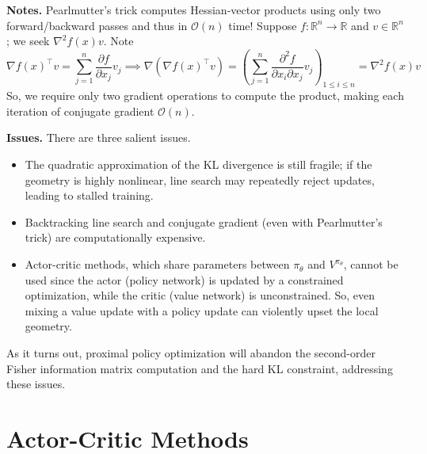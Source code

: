 \documentclass[11pt, letterpaper]{article}
\begin{document}
\begin{remark}
    \textbf{Notes.} Pearlmutter's trick computes Hessian-vector products using only two forward/backward passes and thus in \(\mathcal{O}(n)\) time! Suppose \(f : \mathbb{R}^n \to \mathbb{R}\) and \(v \in \mathbb{R}^n\); we seek \(\nabla^2 f(x) v\). Note 
    \[
        \nabla f(x)^\top v = \sum_{j=1}^n \frac{\partial f}{\partial x_j} v_j
        \implies
        \nabla (\nabla f(x)^\top v) 
        = \left( \sum_{j=1}^n \frac{\partial^2 f}{\partial x_i \partial x_j} v_j \right)_{1 \leq i \leq n}
        = \nabla^2 f(x) v
    \]
    So, we require only two gradient operations to compute the product, making each iteration of conjugate gradient \(\mathcal{O}(n)\). 

    \textbf{Issues.} There are three salient issues. 
    \begin{itemize}
        \item The quadratic approximation of the KL divergence is still fragile; if the geometry is highly nonlinear, line search may repeatedly reject updates, leading to stalled training.
        \item Backtracking line search and conjugate gradient (even with Pearlmutter's trick) are computationally expensive. 
        \item Actor-critic methods, which share parameters between \(\pi_\theta\) and \(V^{\pi_\theta}\), cannot be used since the actor (policy network) is updated by a constrained optimization, while the critic (value network) is unconstrained. So, even mixing a value update with a policy update can violently upset the local geometry. 
    \end{itemize}
    As it turns out, proximal policy optimization will abandon the second-order Fisher information matrix computation and the hard KL constraint, addressing these issues. 
\end{remark}

\section{Actor-Critic Methods}
\end{document}
